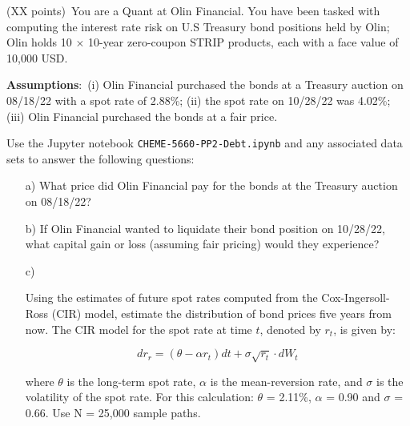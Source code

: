 \item{(XX points)~You are a Quant at Olin Financial.
You have been tasked with computing the interest rate risk on U.S Treasury bond positions held by Olin;
Olin holds 10 $\times$ 10-year zero-coupon STRIP products, each with a face value of 10,000 USD.

\textbf{Assumptions}:~(i) Olin Financial purchased the bonds at a Treasury auction on 08/18/22 with a spot rate of 2.88\%;
(ii) the spot rate on 10/28/22 was 4.02\%; (iii) Olin Financial purchased the bonds at a fair price.

Use the Jupyter notebook \texttt{CHEME-5660-PP2-Debt.ipynb} and any associated data sets to answer the following questions:

\begin{itemize}
    \item[a)]{What price did Olin Financial pay for the bonds at the Treasury auction on 08/18/22?}
    \item[b)]{If Olin Financial wanted to liquidate their bond position on 10/28/22, what capital gain or loss (assuming fair pricing) would they experience?}
    \item[c)]{Using the estimates of future spot rates computed from the Cox-Ingersoll-Ross (CIR) model, estimate the distribution of bond prices five years from now. 
    The CIR model for the spot rate at time $t$, denoted by $r_{t}$, is given by:

    \begin{equation}
        dr_{r} = \left(\theta - \alpha{r}_{t}\right)dt + \sigma\sqrt{r_{t}}\cdot{dW_{t}}
    \end{equation}

    where $\theta$ is the long-term spot rate, $\alpha$ is the mean-reversion rate, and $\sigma$ is the volatility of the
    spot rate. For this calculation: $\theta$ = 2.11\%, $\alpha$ = 0.90 and $\sigma$ = 0.66. Use N = 25,000 sample paths.
    }
\end{itemize}
}